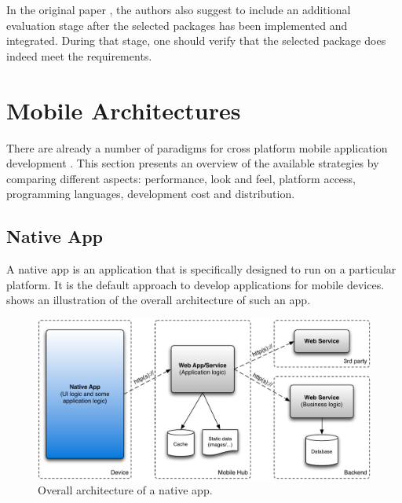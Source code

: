 In the original paper \cite{Jadhav:2009}, the authors also suggest to include an additional evaluation stage after the selected packages has been implemented and integrated. During that stage, one should verify that the selected package does indeed meet the requirements.

\section{Mobile Architectures}



There are already a number of paradigms for cross platform mobile application development \citep{Friese}. This section presents an overview of the available strategies by comparing different aspects: performance, look and feel, platform access, programming languages, development cost and distribution.

\subsection{Native App}

A native app is an application that is specifically designed to run on a particular platform. It is the default approach to develop applications for mobile devices.  shows an illustration of the overall architecture of such an app. 

\begin{figure}[h!]
    \begin{center}
        \includegraphics[width=\textwidth]{figs/native.pdf}
        \caption{
            Overall architecture of a native app. 
        }
        \label{fig:native}
    \end{center}
\end{figure}

